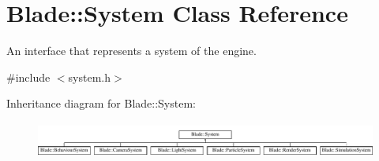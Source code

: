 \hypertarget{class_blade_1_1_system}{}\section{Blade\+:\+:System Class Reference}
\label{class_blade_1_1_system}


An interface that represents a system of the engine.  




{\ttfamily \#include $<$system.\+h$>$}

Inheritance diagram for Blade\+:\+:System\+:\begin{figure}[H]
\begin{center}
\leavevmode
\includegraphics[height=1.196581cm]{class_blade_1_1_system}
\end{center}
\end{figure}
